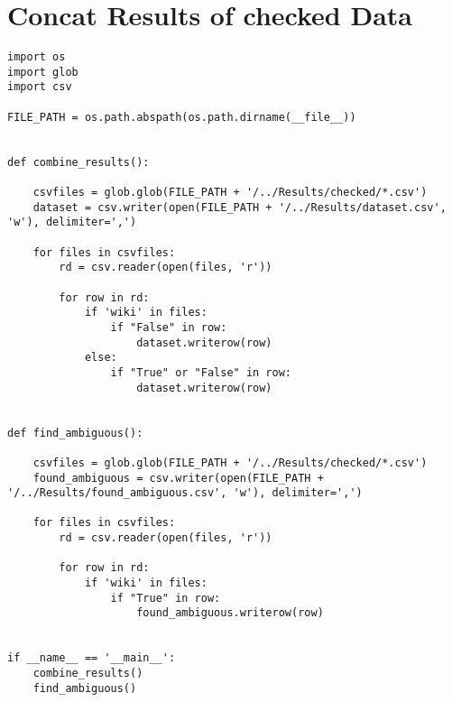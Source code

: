 
\chapter{Concat Results of checked Data}

\label{Appendix3}

\begin{lstlisting}[language=iPython]
import os
import glob
import csv

FILE_PATH = os.path.abspath(os.path.dirname(__file__))


def combine_results():

	csvfiles = glob.glob(FILE_PATH + '/../Results/checked/*.csv')
	dataset = csv.writer(open(FILE_PATH + '/../Results/dataset.csv', 'w'), delimiter=',')
	
	for files in csvfiles:
		rd = csv.reader(open(files, 'r'))
		
		for row in rd:
			if 'wiki' in files:
				if "False" in row:
					dataset.writerow(row)
			else:
				if "True" or "False" in row:
					dataset.writerow(row)


def find_ambiguous():

	csvfiles = glob.glob(FILE_PATH + '/../Results/checked/*.csv')
	found_ambiguous = csv.writer(open(FILE_PATH + '/../Results/found_ambiguous.csv', 'w'), delimiter=',')
	
	for files in csvfiles:
		rd = csv.reader(open(files, 'r'))
		
		for row in rd:
			if 'wiki' in files:
				if "True" in row:
					found_ambiguous.writerow(row)
		

if __name__ == '__main__':
	combine_results()
	find_ambiguous()

\end{lstlisting}